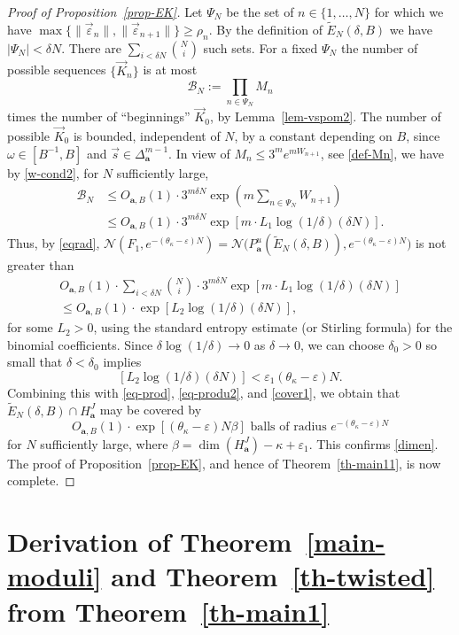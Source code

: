 \documentclass[JEP,XML,SOM,Unicode]{cedram}
\let\mathcal\mathscr
\let\epsilon\varepsilon
\theoremstyle{plain}
\theoremstyle{definition}
\let\wt\widetilde
\newcommand\bom{{\boldsymbol a}}\let\ba\bom
\let\eps\varepsilon
\let\om\omega
\newcommand\Ns{{\mathscr N}}
\newcommand\Bk{\mathcal{B}}
\begin{document}
\begin{proof}[Proof of Proposition~\ref{prop-EK}]
Let $\Psi_N$ be the set of $n\in \{1,\ldots,N\}$ for which
we have $\max\{\|\vec\eps_{n}\|,\|\vec\eps_{{n+1}}\|\}\ge \rho_n$.
By the definition of $\wt E_N(\delta,B)$ we have $|\Psi_N| <\delta N$.
There are $\sum_{i< \delta N} \binom{N}{ i}$ such sets. For a fixed $\Psi_N$ the number of possible sequences $\{\vec K_{n}\}$ is at most
\[
\Bk_N:= \prod_{n\in \Psi_N} M_n
\]
times the number of ``beginnings'' $\vec K_{0}$, by Lemma~\ref{lem-vspom2}.
The number of possible $\vec K_{0}$ is bounded, independent of $N$, by a constant depending on $B$, since $\om\in [B^{-1},B]$ and $\vec s\in \Delta_\bom^{m-1}$.
In view of $M_n \le 3^m e^{mW_{n+1}}$, see \eqref{def-Mn}, we have by \eqref{w-cond2}, for $N$ sufficiently large,
\begin{align*}
\Bk_N &\le O_{\bom,B}(1) \cdot 3^{m\delta N} \exp(m \textstyle\sum_{n\in \Psi_N}W_{n+1})\\
&\le O_{\bom,B}(1) \cdot 3^{m\delta N} \exp[m\cdot L_1\log(1/\delta)(\delta N)].
\end{align*}
Thus, by \eqref{eqrad},
$\Ns(F_1, e^{-(\theta_\kappa-\epsilon)N})\!=\!\Ns\bigl(P_\bom^u(\wt E_N(\delta,B)),e^{-(\theta_\kappa-\epsilon)N}\bigr)$ is not greater than
\begin{multline}
\label{lasta1}
O_{\bom,B}(1)\cdot \sum_{i<\delta N} \binom{N}{i} \cdot 3^{m\delta N} \exp[m\cdot L_1\log(1/\delta)(\delta N)]\\[-8pt]
\le O_{\bom,B}(1)\cdot \exp[L_2 \log(1/\delta)(\delta N)],
\end{multline}
for some $L_2>0$, using the standard entropy estimate (or Stirling formula) for the binomial coefficients. Since $\delta\log(1/\delta)\to 0$ as $\delta\to 0$, we can choose $\delta_0>0$ so small
that $\delta< \delta_0$ implies
\[
\left[L_2\log(1/\delta)(\delta N)\right] < \epsilon_1 (\theta_\kappa-\epsilon)N.
\]
Combining this with \eqref{eq-prod}, \eqref{eq-produ2}, and \eqref{cover1}, we obtain that $\wt E_N(\delta,B)\cap H_\bom^J$ may be covered by
\[
O_{\bom,B}(1)\cdot\exp\left[(\theta_\kappa-\eps)N\beta\right] \text{ balls of radius } e^{-(\theta_\kappa-\epsilon)N}
\]
for $N$ sufficiently large, where $\beta = \dim(H_\bom^J) - \kappa + \epsilon_1$. This confirms \eqref{dimen}.
The proof of Proposition~\ref{prop-EK}, and hence of
Theorem~\ref{th-main11}, is now complete.
\end{proof}

\section{Derivation of Theorem~\ref{main-moduli} and Theorem~\ref{th-twisted} from Theorem~\ref{th-main1} } \label{sec-deriv}
\end{document}
